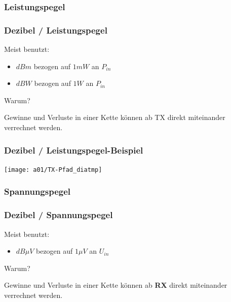 \subsubsection{Leistungspegel}

\begin{frame}
    \frametitle{Dezibel / Leistungspegel}

    Meist benutzt:

    \begin{itemize}
        \item $dBm$ bezogen auf $1 mW$ an $P_{in}$
        \item $dBW$ bezogen auf $1 W$ an $P_{in}$
    \end{itemize}

    \begin{center}
        Warum?
    \end{center}

    \pause

    Gewinne und Verluste in einer Kette können ab TX direkt miteinander
    verrechnet werden.

\end{frame}

\begin{frame}
    \frametitle{Dezibel / Leistungspegel-Beispiel}

    \texttt{[image: a01/TX-Pfad\_diatmp]}

    \vspace{3em}


\end{frame}

\subsubsection{Spannungspegel}

\begin{frame}
    \frametitle{Dezibel / Spannungspegel}

    Meist benutzt:

    \begin{itemize}
        \item $dB \mu V$ bezogen auf $1 \mu V$ an $U_{in}$
    \end{itemize}

    \begin{center}
        Warum?
    \end{center}

    \pause

    Gewinne und Verluste in einer Kette können ab \textbf{RX} direkt miteinander
    verrechnet werden.

\end{frame}

